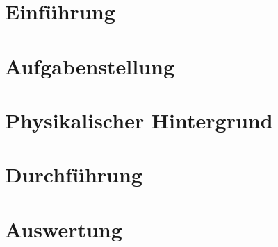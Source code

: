 \documentclass[11pt,a4paper]{report}
\begin{document}
\tableofcontents

\chapter{Einführung}
\chapter{Aufgabenstellung}
\chapter{Physikalischer Hintergrund}
\chapter{Durchführung}
\chapter{Auswertung}
\end{document}
